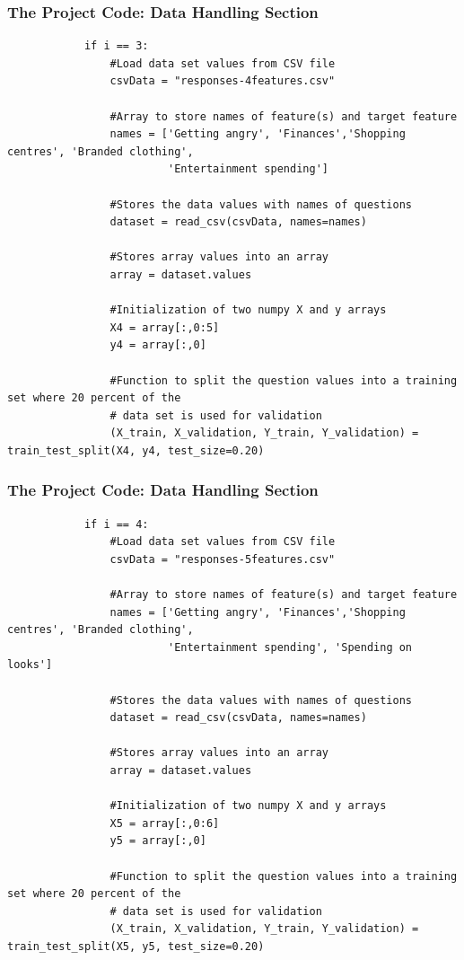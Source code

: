 \documentclass{beamer}
\begin{document}

\begin{frame}[fragile]
\frametitle{The Project Code: Data Handling Section}

\fontsize{6}{5}
\begin{verbatim}
            if i == 3:
                #Load data set values from CSV file
                csvData = "responses-4features.csv"

                #Array to store names of feature(s) and target feature
                names = ['Getting angry', 'Finances','Shopping centres', 'Branded clothing',
                         'Entertainment spending']
    
                #Stores the data values with names of questions
                dataset = read_csv(csvData, names=names)

                #Stores array values into an array
                array = dataset.values

                #Initialization of two numpy X and y arrays
                X4 = array[:,0:5]
                y4 = array[:,0]

                #Function to split the question values into a training set where 20 percent of the 
                # data set is used for validation
                (X_train, X_validation, Y_train, Y_validation) = train_test_split(X4, y4, test_size=0.20)

\end{verbatim}
\end{frame}


\begin{frame}[fragile]
\frametitle{The Project Code: Data Handling Section}

\fontsize{6}{5}
\begin{verbatim}
            if i == 4:
                #Load data set values from CSV file
                csvData = "responses-5features.csv"    

                #Array to store names of feature(s) and target feature
                names = ['Getting angry', 'Finances','Shopping centres', 'Branded clothing',
                         'Entertainment spending', 'Spending on looks']
    
                #Stores the data values with names of questions
                dataset = read_csv(csvData, names=names)

                #Stores array values into an array
                array = dataset.values

                #Initialization of two numpy X and y arrays
                X5 = array[:,0:6]
                y5 = array[:,0]

                #Function to split the question values into a training set where 20 percent of the 
                # data set is used for validation
                (X_train, X_validation, Y_train, Y_validation) = train_test_split(X5, y5, test_size=0.20)

\end{verbatim}
\end{frame}
\end{document}
